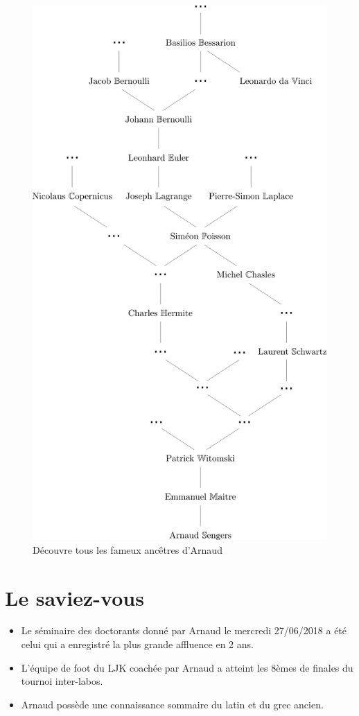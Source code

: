 \documentclass[a4paper]{leaflet}
\begin{document}
\begin{figure}
  \includegraphics[width=\textwidth]{genealogie.png}
  \caption{Découvre tous les fameux ancêtres d'Arnaud}
\label{fig:genealogie}
\end{figure}


\section*{Le saviez-vous}
\begin{itemize}
\item Le séminaire des doctorants donné par Arnaud le mercredi 27/06/2018 a été celui qui a enregistré la plus grande affluence en 2 ans.
\item L'équipe de foot du LJK coachée par Arnaud a atteint les 8èmes de finales du tournoi inter-labos.
\item Arnaud possède une connaissance sommaire du latin et du grec ancien.
\end{itemize}
\end{document}
